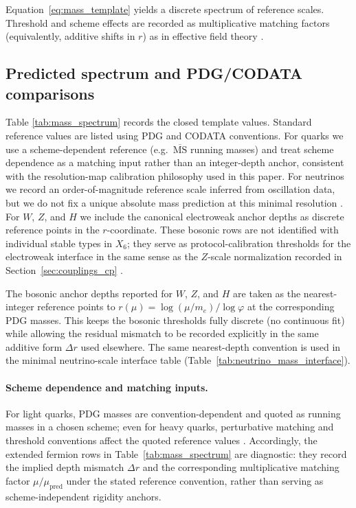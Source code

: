 Equation~\eqref{eq:mass_template} yields a discrete spectrum of reference scales.
Threshold and scheme effects are recorded as multiplicative matching factors (equivalently, additive shifts in $r$) as in effective field theory \cite{PeskinSchroeder1995,PDGRPP2024}.

\subsection{Predicted spectrum and PDG/CODATA comparisons}
\label{subsec:mass_spectrum_table}

Table \ref{tab:mass_spectrum} records the closed template values.
Standard reference values are listed using PDG and CODATA conventions.
For quarks we use a scheme-dependent reference (e.g.\ $\overline{\mathrm{MS}}$ running masses) and treat scheme dependence as a matching input rather than an integer-depth anchor, consistent with the resolution-map calibration philosophy used in this paper.
For neutrinos we record an order-of-magnitude reference scale inferred from oscillation data, but we do not fix a unique absolute mass prediction at this minimal resolution \cite{PDGRPP2024,Esteban2020NuFIT}.
For $W$, $Z$, and $H$ we include the canonical electroweak anchor depths as discrete reference points in the $r$-coordinate.
These bosonic rows are not identified with individual stable types in $X_6$; they serve as protocol-calibration thresholds for the electroweak interface in the same sense as the $Z$-scale normalization recorded in Section~\ref{sec:couplings_cp} \cite{PDGRPP2024}.
\begin{remark}\label{rem:boson_anchor_depths}
The bosonic anchor depths reported for $W$, $Z$, and $H$ are taken as the nearest-integer reference points to $r(\mu)=\log(\mu/m_e)/\log\varphi$ at the corresponding PDG masses.
This keeps the bosonic thresholds fully discrete (no continuous fit) while allowing the residual mismatch to be recorded explicitly in the same additive form $\Delta r$ used elsewhere.
The same nearest-depth convention is used in the minimal neutrino-scale interface table (Table~\ref{tab:neutrino_mass_interface}).
\end{remark}
\paragraph{Scheme dependence and matching inputs.}
For light quarks, PDG masses are convention-dependent and quoted as running masses in a chosen scheme; even for heavy quarks, perturbative matching and threshold conventions affect the quoted reference values \cite{PDGRPP2024}.
Accordingly, the extended fermion rows in Table~\ref{tab:mass_spectrum} are diagnostic: they record the implied depth mismatch $\Delta r$ and the corresponding multiplicative matching factor $\mu/\mu_{\mathrm{pred}}$ under the stated reference convention, rather than serving as scheme-independent rigidity anchors.

